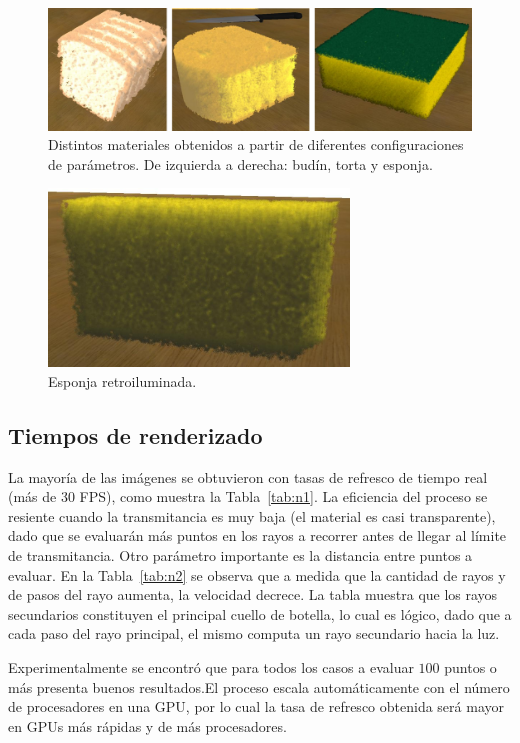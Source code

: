 \begin{figure}[htb!]
  \centerline{\includegraphics[width=13cm]{fig6}}
  \caption{Distintos materiales obtenidos a partir de diferentes configuraciones de parámetros. De izquierda a derecha: budín, torta y esponja. }
  \label{fg:fig6}

\end{figure}

\begin{figure}[htb!]
  \centerline{\includegraphics[width=8cm]{fig7}}
  \caption{Esponja retroiluminada.}
  \label{fg:fig7}
\end{figure}

\subsection{Tiempos de renderizado}

La mayoría de las imágenes se obtuvieron con tasas de refresco de tiempo real (más de 30 FPS), como muestra la Tabla~\ref{tab:n1}. La eficiencia del proceso se resiente cuando la transmitancia es muy baja (el material es casi transparente), dado que se evaluarán más puntos en los rayos a recorrer antes de llegar al límite de transmitancia. Otro parámetro importante es la distancia entre puntos a evaluar. En la Tabla~\ref{tab:n2} se observa que a medida que la cantidad de rayos y de pasos del rayo aumenta, la velocidad decrece. La tabla muestra que los rayos secundarios constituyen el principal cuello de botella, lo cual es lógico, dado que a cada paso del rayo principal, el mismo computa un rayo secundario hacia la luz.

Experimentalmente se encontró que para todos los casos a evaluar $100$ puntos o más presenta buenos resultados.El proceso escala automáticamente con el número de procesadores en una GPU, por lo cual la tasa de refresco obtenida será mayor en GPUs más rápidas y de más procesadores.


